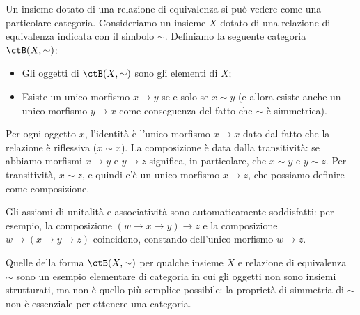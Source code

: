 \begin{example}\label{ex_cat_rel_equiv}
	Un insieme dotato di una relazione di equivalenza si può vedere come una particolare categoria. Consideriamo un insieme \(X\) dotato di una relazione di equivalenza indicata con il simbolo \(\sim\).
	Definiamo la seguente categoria \(\ctB(X,\sim)\):
	\begin{itemize}
		\item Gli oggetti di \(\ctB(X,\sim)\) sono gli elementi di \(X\);
		\item Esiste un unico morfismo \(x\to y\) se e solo se \(x\sim y\) (e allora esiste anche un unico morfismo \(y\to x\) come conseguenza del fatto che \(\sim\) è simmetrica).
	\end{itemize}
	Per ogni oggetto \(x\), l'identità è l'unico morfismo \(x\to x\) dato dal fatto che la relazione è riflessiva (\(x\sim x\)).
	La composizione è data dalla transitività: se abbiamo morfismi \(x\to y\) e \(y\to z\) significa, in particolare, che \(x\sim y\) e \(y\sim z\). Per transitività, \(x\sim z\), e quindi c'è un unico morfismo \(x\to z\), che possiamo definire come composizione.

	Gli assiomi di unitalità e associatività sono automaticamente soddisfatti: per esempio, la composizione \((w\to x\to y)\to z\) e la composizione \(w\to (x\to y\to z)\) coincidono, constando dell'unico morfismo \(w\to z\).
\end{example}
Quelle della forma \(\ctB(X,\sim)\) per qualche insieme \(X\) e relazione di equivalenza \(\sim\) sono un esempio elementare di categoria in cui gli oggetti non sono insiemi strutturati, ma non è quello più semplice possibile: la proprietà di simmetria di \(\sim\) non è essenziale per ottenere una categoria.

